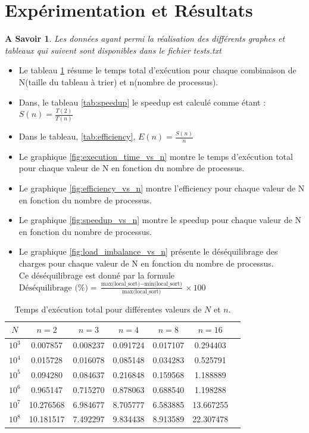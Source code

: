 \documentclass[a4paper,13pt]{book}
\newtheorem{know1}{A Savoir}[section]
\newenvironment{know}{\begin{know1}\color{blue_know}}{\end{know1}}
\begin{document}
\section{Expérimentation et Résultats}
\begin{know}
Les données ayant permi la réalisation des différents graphes et tableaux qui suivent sont disponibles dans le fichier tests.txt
\end{know}
\begin{itemize}
    \item Le tableau \ref{tab:execution_time_total} résume le temps total d'exécution pour chaque combinaison de N(taille du tableau à trier) et n(nombre de processus).
    \item Dans, le tableau \ref{tab:speedup} le speedup est calculé comme étant : $S(n) = \frac{T(2)}{T(n)}$
    \item Dans le tableau, \ref{tab:efficiency}, $E(n)=\frac{S(n)}{n}$
    \item Le graphique \ref{fig:execution_time_vs_n} montre le temps d'exécution total pour chaque valeur de N en fonction du nombre de processus.
    \item Le graphique \ref{fig:efficiency_vs_n} montre l'efficiency pour chaque valeur de N en fonction du nombre de processus.
    \item Le graphique \ref{fig:speedup_vs_n} montre le speedup pour chaque valeur de N en fonction du nombre de processus.
    \item Le graphique \ref{fig:load_imbalance_vs_n} présente le déséquilibrage des charges pour chaque valeur de N en fonction du nombre de processus.\\
    Ce déséquilibrage est donné par la formule $\text{Déséquilibrage (\%)} = \frac{\text{max(local\_sort)} - \text{min(local\_sort)}}{\text{max(local\_sort)}} \times 100$
\end{itemize}
\begin{table}[ht]
  \centering
  \caption{Temps d'exécution total pour différentes valeurs de $ N $ et $ n $.}
  \label{tab:execution_time_total}
  \begin{tabular}{@{}ccccccc@{}}
    \toprule
    $ N $ & $ n = 2 $ & $ n = 3 $ & $ n = 4 $ & $ n = 8 $ & $ n = 16 $ \\
    \midrule
    $ 10^3 $ & 0.007857 & 0.008237 & 0.091724 & 0.017107 & 0.294403 \\
    $ 10^4 $ & 0.015728 & 0.016078 & 0.085148 & 0.034283 & 0.525791 \\
    $ 10^5 $ & 0.094280 & 0.084637 & 0.216848 & 0.159568 & 1.188889 \\
    $ 10^6 $ & 0.965147 & 0.715270 & 0.878063 & 0.688540 & 1.198288 \\
    $ 10^7 $ & 10.276568 & 6.984677 & 8.705777 & 6.583885 & 13.667255 \\
    $ 10^8 $ & 10.181517 & 7.492297 & 9.834438 & 8.913589 & 22.307478 \\
    \bottomrule
  \end{tabular}
\end{table}
\end{document}
